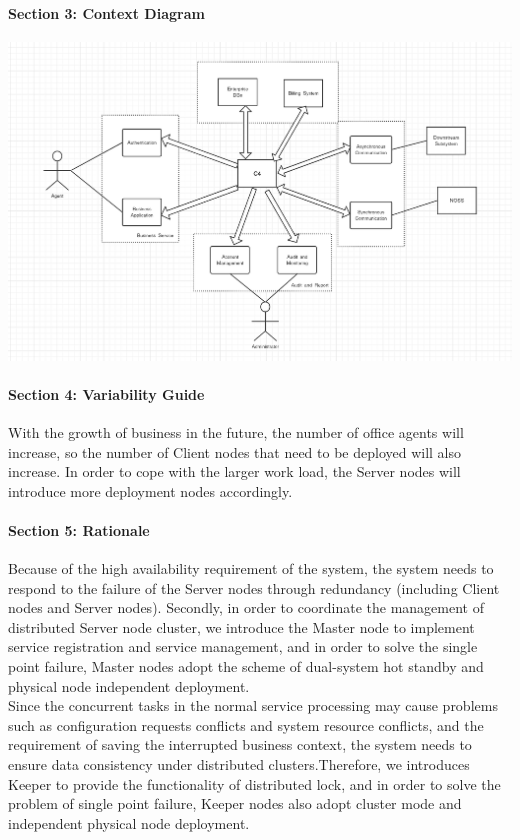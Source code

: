 \documentclass{article}
\begin{document}
			\paragraph{Section 3: Context Diagram}
			\begin{center}
			\includegraphics[scale=0.3]{deployment2.png}
			\end{center}
			\paragraph{Section 4: Variability Guide}
			With the growth of business in the future, the number of office agents will increase, so the number of Client nodes that need to be deployed will also increase. In order to cope with the larger work load, the Server nodes will introduce more deployment nodes accordingly.
			\paragraph{Section 5: Rationale}
			Because of the high availability requirement of the system, the system needs to respond to the failure of the Server nodes through redundancy (including Client nodes and Server nodes). Secondly, in order to coordinate the management of distributed Server node cluster, we introduce the Master node to implement service registration and service management, and in order to solve the single point failure, Master nodes adopt the scheme of dual-system hot standby and physical node independent deployment.\\
			Since the concurrent tasks in the normal service processing may cause problems such as configuration requests conflicts and system resource conflicts, and the requirement of saving the interrupted business context, the system needs to ensure data consistency under distributed clusters.Therefore, we introduces Keeper to provide the functionality of distributed lock, and in order to solve the problem of single point failure, Keeper nodes also adopt cluster mode and independent physical node deployment.
\end{document}
